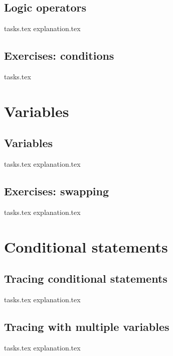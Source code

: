     \section{Logic operators}
    {tasks.tex}        \newpage
    {explanation.tex}     \newpage

    \section{Exercises: conditions}
    {tasks.tex}           \newpage \mbox{} \newpage

    \chapter{Variables}
    \newpage

    \section{Variables}
    {tasks.tex}         \newpage
    {explanation.tex}      \newpage

    \section{Exercises: swapping}
    {tasks.tex}                 \newpage
    {explanation.tex}           \newpage

    \chapter{Conditional statements}
    \newpage

    \section{Tracing conditional statements}
    {tasks.tex}        \newpage
    {explanation.tex}     \newpage

    \section{Tracing with multiple variables}
    {tasks.tex}         \newpage
    {explanation.tex}      \newpage

